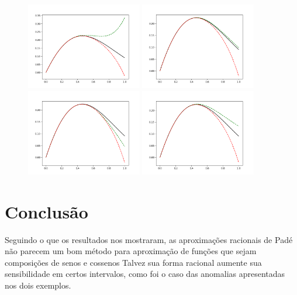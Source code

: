 \documentclass{article}
\begin{document}
    \begin{figure}[h]
        \centering
        \includegraphics[width=0.45\textwidth]{Figure_4.png}
        \includegraphics[width=0.45\textwidth]{Figure_5.png}\\
        \includegraphics[width=0.45\textwidth]{Figure_6.png}
        \includegraphics[width=0.45\textwidth]{Figure_7.png}\\
    \end{figure}

\section{Conclusão}

    Seguindo o que os resultados nos mostraram, as aproximações racionais de Padé
    não parecem um bom método para aproximação de funções que sejam composições de senos e cossenos
    Talvez sua forma racional aumente sua sensibilidade em certos intervalos, como foi o caso das
    anomalias apresentadas nos dois exemplos.
\end{document}
